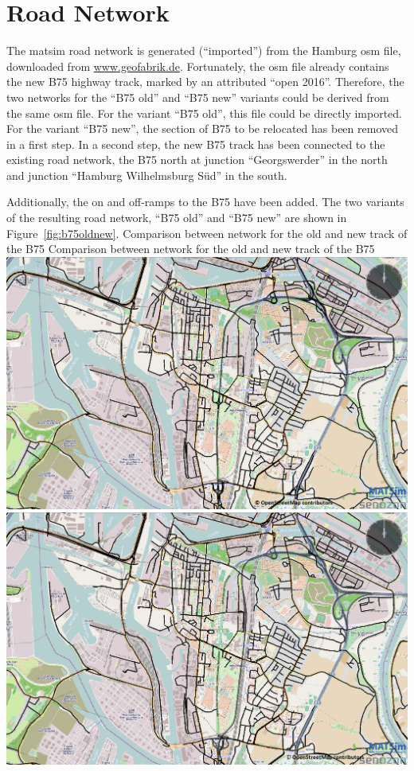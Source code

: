 \section{Road Network}
The \gls{matsim} road network is generated (``imported'') from the Hamburg \gls{osm} file, downloaded from \url{www.geofabrik.de}. Fortunately, the \gls{osm} file already contains the new B75 highway track, marked by an attributed ``open 2016''. Therefore, the two networks for the ``B75 old'' and ``B75 new''  variants could be derived from the same \gls{osm} file. For the variant ``B75 old'', this file could be directly imported. For the variant ``B75 new'', the section of B75 to be relocated has been removed in a first step. In a second step, the new B75 track has been connected to the existing road network, \ie the B75 north at junction ``Georgswerder'' in the north and junction ``Hamburg Wilhelmsburg Süd'' in the south.

Additionally, the on and off-ramps to the B75 have been added. The two variants of the resulting road network, \ie ``B75 old'' and ``B75 new'' are shown in Figure~\ref{fig:b75oldnew}.
%
\createfigure%
{Comparison between network for the old and new track of the B75}%
{Comparison between network for the old and new track of the B75}%
{\label{fig:b75oldnew}}%
{%
  \createsubfigure%
  {}%
  {\includegraphics[width=.475\linewidth]{scenarios/figures/B75old}}%
  {}%
  {}%
  \createsubfigure%
  {}%
  {\includegraphics[width=.475\linewidth]{scenarios/figures/B75new}}
  {}%
  {}%
}%
  {}%


